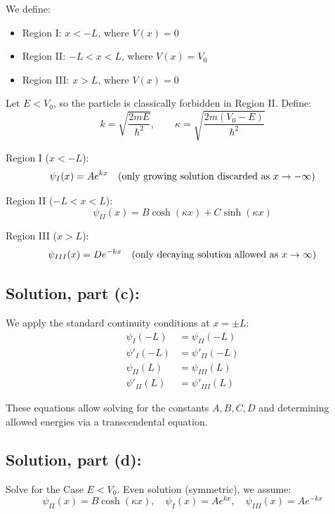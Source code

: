 \documentclass[12pt]{article}
\begin{document}
        We define:
        \begin{itemize}
            \item Region I: \( x < -L \), where \( V(x) = 0 \)
            \item Region II: \( -L < x < L \), where \( V(x) = V_0 \)
            \item Region III: \( x > L \), where \( V(x) = 0 \)
        \end{itemize}
        
        Let \( E < V_0 \), so the particle is classically forbidden in Region II. Define:
        \[
            k = \sqrt{\frac{2mE}{\hbar^2}}, \qquad \kappa = \sqrt{\frac{2m(V_0 - E)}{\hbar^2}}
        \]
        
        Region I (\( x < -L \)):
        \[
            \psi_I(x) = A e^{k x}
            \quad \text{(only growing solution discarded as \( x \to -\infty \))}
        \]
        
        Region II (\( -L < x < L \)):
        \[
            \psi_{II}(x) = B \cosh(\kappa x) + C \sinh(\kappa x)
        \]
        
        Region III (\( x > L \)):
        \[
            \psi_{III}(x) = D e^{-k x}
            \quad \text{(only decaying solution allowed as \( x \to \infty \))}
        \]

    \subsection{Solution, part (c):}
        We apply the standard continuity conditions at \( x = \pm L \):
        \begin{align*}
            \psi_I(-L) &= \psi_{II}(-L) \\
            \psi'_I(-L) &= \psi'_{II}(-L) \\
            \psi_{II}(L) &= \psi_{III}(L) \\
            \psi'_{II}(L) &= \psi'_{III}(L)
        \end{align*}

        These equations allow solving for the constants \( A, B, C, D \) and determining allowed energies via a transcendental equation.

    \subsection{Solution, part (d):}
        Solve for the Case \( E < V_0 \). Even solution (symmetric), we assume:
        \[
            \psi_{II}(x) = B \cosh(\kappa x), \quad \psi_I(x) = A e^{k x}, \quad \psi_{III}(x) = A e^{-k x}
        \]
        
\end{document}

